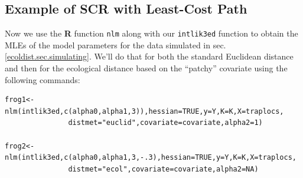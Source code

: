\subsection{Example of SCR with Least-Cost Path}

Now we use the {\bf R} function \mbox{\tt nlm} along with
our \mbox{\tt intlik3ed} function to  obtain the MLEs of the
model parameters for the data simulated 
in sec. \ref{ecoldist.sec.simulating}.
 We'll do that for both the standard Euclidean distance
and then for the ecological distance based on the ``patchy''
covariate using the following commands:
{\small
 \begin{verbatim}
frog1<-nlm(intlik3ed,c(alpha0,alpha1,3)),hessian=TRUE,y=Y,K=K,X=traplocs,
               distmet="euclid",covariate=covariate,alpha2=1)

frog2<-nlm(intlik3ed,c(alpha0,alpha1,3,-.3),hessian=TRUE,y=Y,K=K,X=traplocs,
               distmet="ecol",covariate=covariate,alpha2=NA)
\end{verbatim}
}

